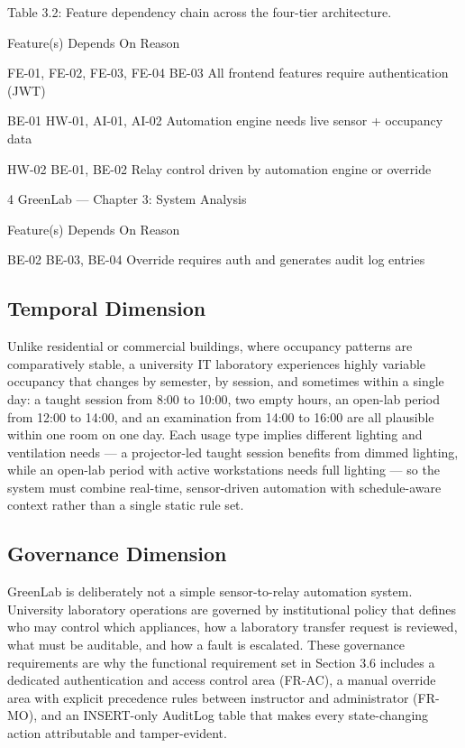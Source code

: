 Table 3.2: Feature dependency chain across the four-tier architecture.

Feature(s) Depends On Reason

FE-01, FE-02, FE-03, FE-04 BE-03 All frontend features require
authentication (JWT)

BE-01 HW-01, AI-01, AI-02 Automation engine needs live sensor +
occupancy data

HW-02 BE-01, BE-02 Relay control driven by automation
engine or override




4
GreenLab --- Chapter 3: System Analysis


Feature(s) Depends On Reason

BE-02 BE-03, BE-04 Override requires auth and generates
audit log entries


\subsection{Temporal Dimension}

Unlike residential or commercial buildings, where occupancy patterns are comparatively stable, a
university IT laboratory experiences highly variable occupancy that changes by semester, by
session, and sometimes within a single day: a taught session from 8:00 to 10:00, two empty hours,
an open-lab period from 12:00 to 14:00, and an examination from 14:00 to 16:00 are all plausible
within one room on one day. Each usage type implies different lighting and ventilation needs --- a
projector-led taught session benefits from dimmed lighting, while an open-lab period with active
workstations needs full lighting --- so the system must combine real-time, sensor-driven
automation with schedule-aware context rather than a single static rule set.

\subsection{Governance Dimension}

GreenLab is deliberately not a simple sensor-to-relay automation system. University laboratory
operations are governed by institutional policy that defines who may control which appliances,
how a laboratory transfer request is reviewed, what must be auditable, and how a fault is escalated.
These governance requirements are why the functional requirement set in Section 3.6 includes a
dedicated authentication and access control area (FR-AC), a manual override area with explicit
precedence rules between instructor and administrator (FR-MO), and an INSERT-only AuditLog
table that makes every state-changing action attributable and tamper-evident.

